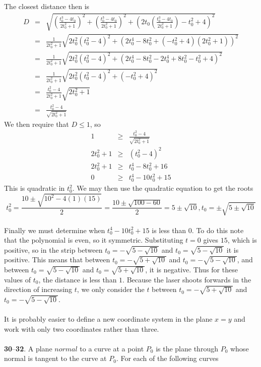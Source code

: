 \documentclass[12pt]{amsbook}
\begin{document}
The closest distance then is
 \begin{eqnarray*}
 D&=&\sqrt{(\frac{t_0^3-4t_0}{2t_0^2+1})^2+(\frac{t_0^3-4t_0}{2t_0^2+1})^2+(2t_0(\frac{t_0^3-4t_0}{2t_0^2+1})-t_0^2+4)^2}\\
 &=&\frac{1}{2t_0^2+1}\sqrt{2t_0^2(t_0^2-4)^2+(2t_0^4-8t_0^2+(-t_0^2+4)(2t_0^2+1))^2}\\
 &=&\frac{1}{2t_0^2+1}\sqrt{2t_0^2(t_0^2-4)^2+(2t_0^4-8t_0^2-2t_0^4+8t_0^2-t_0^2+4)^2}\\
 &=&\frac{1}{2t_0^2+1}\sqrt{2t_0^2(t_0^2-4)^2+(-t_0^2+4)^2}\\
 &=&\frac{t_0^2-4}{2t_0^2+1}\sqrt{2t_0^2+1}\\
 &=&\frac{t_0^2-4}{\sqrt{2t_0^2+1}}
 \end{eqnarray*}
 We then require that $D\leq 1$, so
 \begin{eqnarray*}
 1&\geq& \frac{t_0^2-4}{\sqrt{2t_0^2+1}}\\
 2t_0^2+1 &\geq & (t_0^2-4)^2\\
 2t_0^2+1 &\geq & t_0^4-8t_0^2+16\\
 0 &\geq & t_0^4-10t_0^2+15
 \end{eqnarray*}
 This is quadratic in $t_0^2$. We may then use the quadratic equation to get the roots
 $$t_0^2=\frac{10\pm \sqrt{10^2-4(1)(15)}}{2}=\frac{10\pm\sqrt{100-60}}{2}=5 \pm \sqrt{10}, t_0=\pm \sqrt{5\pm \sqrt{10}}$$
 \\
 Finally we must determine when $t_0^4-10t_0^2+15$ is less than $0$. To do this note that the polynomial is even, so it symmetric. Substituting $t=0$ gives $15$, which is positive, so in the strip between $t_0=-\sqrt{5-\sqrt{10}}$ and $t_0=\sqrt{5-\sqrt{10}}$ it is positive. This means that between $t_0=-\sqrt{5+\sqrt{10}}$ and $t_0=-\sqrt{5-\sqrt{10}}$, and between $t_0=\sqrt{5-\sqrt{10}}$  and $t_0=\sqrt{5+\sqrt{10}}$, it is negative. Thus for these values of $t_0$, the distance is less than $1$. Because the laser shoots forwards in the direction of increasing $t$, we only consider the $t$ between $t_0=-\sqrt{5+\sqrt{10}}$ and $t_0=-\sqrt{5-\sqrt{10}}$.
 \\
 \\
 It is probably easier to define a new coordinate system in the plane $x=y$ and work with only two coordinates rather than three.
 \\
 \\
 \noindent
{\small {\bf 30}--{\bf 32}}. A plane $\textit{normal}$ to a curve at a point $P_0$ is the plane through $P_0$ whose normal is tangent to the curve at $P_0$. For each of the following curves
\end{document}
